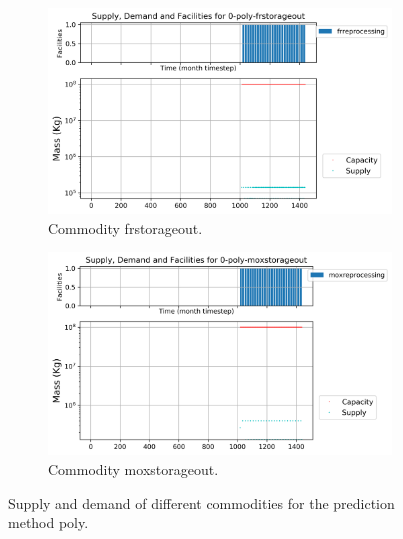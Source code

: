 \documentclass[11pt]{article}
\begin{document}
\begin{figure}[H]
	\centering
	\begin{subfigure}[t]{0.45\textwidth}
		\centering
		\includegraphics[width=\linewidth]{29-figures/0-poly-frstorageout.png} 
		\caption{Commodity frstorageout.}
		\label{fig:29-frstorageout}
	\end{subfigure}
	\vspace{1cm}
	\begin{subfigure}[t]{0.45\textwidth}
		\centering
		\includegraphics[width=\linewidth]{29-figures/0-poly-moxstorageout.png} 
		\caption{Commodity moxstorageout.}
		\label{fig:29-moxstorageout}
	\end{subfigure}
	\hfill
	\caption{Supply and demand of different commodities for the prediction method poly.}
	\label{fig:29-storageout2}
\end{figure}
\end{document}
